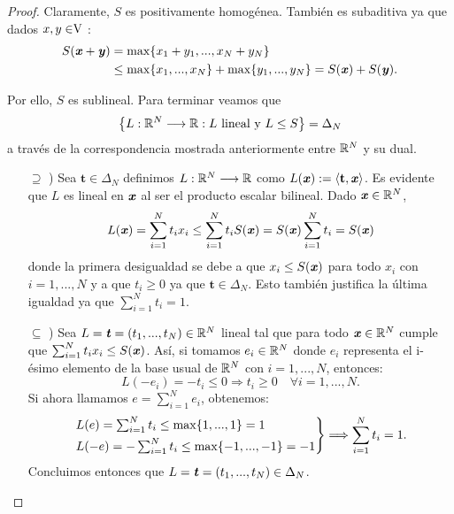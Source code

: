 	\begin{proof}
		Claramente, $ S $ es positivamente homogénea. También es subaditiva ya que dados $ x,y \in \vecSpace $ : 
		\begin{equation*}
		\begin{split}
		S(\textbf{\emph{x}}+\textbf{\emph{y}}) &= \max \{x_1 + y_1, ..., x_N +y_N \}\\ 
		&\leq \max\{x_1, ..., x_N\} + \max \{y_1, ...,y_N\} = S(\textbf{\emph{x}}) + S(\textbf{\emph{y}}).
		\end{split}
		\end{equation*}
		
		Por ello, $ S $ es sublineal. Para terminar veamos que  \[\left\lbrace L:\mathbb{R}^N \longrightarrow \mathbb{R} : L \text{ lineal y }L\leq S \right\rbrace  =  \Delta_N \]
		 a través de la correspondencia mostrada anteriormente entre $ \mathbb{R}^N $ y su dual.
		
		\begin{itemize}
			\item[$ \supseteq $ )] Sea $ \mathbf{t} \in \Delta_N$ definimos $ L:\mathbb{R}^N \longrightarrow \mathbb{R} $ como $ L(\textbf{\emph{x}}):= \langle \mathbf{t},\textbf{\emph{x}} \rangle $. Es evidente que $ L $ es lineal en $ \textbf{\emph{x}} $ al ser el producto escalar bilineal. Dado $ \textbf{\emph{x}} \in \mathbb{R}^N $,
			\begin{equation*}
				L(\textbf{\emph{x}}) = \sum_{i=1}^{N}{t_i x_i} \leq \sum_{i=1}^{N}{t_i S(\textbf{\emph{x}})} = S(\textbf{\emph{x}})\sum_{i=1}^{N}{t_i} = S(\textbf{\emph{x}})
			\end{equation*}
			donde la primera desigualdad se debe a que $ x_i \leq S(\textbf{\emph{x}})$ para todo $ x_i$ con $ i=1,...,N $ y a que $ t_i \geq 0 $ ya que $ \mathbf{t} \in \Delta_N$. Esto también justifica la última igualdad ya que $ \sum_{i=1}^{N}{t_i} = 1 $.
			
			\item[$ \subseteq $ )] Sea $ L = \textbf{\emph{t}} = (t_1,...,t_N) \in \mathbb{R}^N $ lineal tal que para todo $ \textbf{\emph{x}} \in \mathbb{R}^N $ cumple que $ \sum_{i=1}^{N}{t_i x_i} \leq S(\textbf{\emph{x}})$. Así, si tomamos $ e_i \in \mathbb{R}^N $ donde $ e_i $ representa el i-ésimo elemento de la base usual de $ \mathbb{R}^N $ con $ i=1,...,N $, entonces:   		
			\begin{equation*}
				L(-e_i) = -t_i \leq 0 \Longrightarrow t_i \geq 0 \quad \forall i=1,...,N.
			\end{equation*}
			Si ahora llamamos $ e = \sum_{i=1}^{N}{e_i} $, obtenemos:
			\begin{equation*}
				\begin{rcases*}
				L(e) = \sum_{i=1}^{N}{t_i} \leq \max \{1, ...,1\} = 1 \\
				L(-e) = -\sum_{i=1}^{N}{t_i} \leq \max \{-1, ...,-1\} = -1
				\end{rcases*} \Longrightarrow \sum_{i=1}^{N}{t_i} = 1.
			\end{equation*}
			Concluimos entonces que $ L = \textbf{\emph{t}} = (t_1,...,t_N) \in \Delta_N $.
		\end{itemize}
		
	\end{proof}

